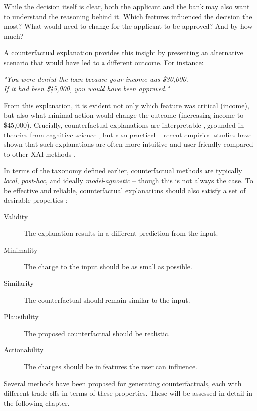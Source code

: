 While the decision itself is clear, both the applicant and the bank may also want to understand the reasoning behind it. Which features influenced the decision the most? What would need to change for the applicant to be approved? And by how much?

A counterfactual explanation provides this insight by presenting an alternative scenario that would have led to a different outcome. For instance:

\begin{center}
    \textit{"You were denied the loan because your income was \$30,000.\\
        If it had been \$45,000, you would have been approved."}
\end{center}

From this explanation, it is evident not only which feature was critical (income), but also what minimal action would change the outcome (increasing income to \$45,000).
Crucially, counterfactual explanations are interpretable \cite{pearl2009causal},
grounded in theories from cognitive science \cite{byrne2019counterfactuals},
but also practical -- recent empirical studies have shown that such explanations are often
more intuitive and user-friendly compared to other XAI methods \cite{warren2022features}.

In terms of the taxonomy defined earlier, counterfactual methods are typically \emph{local}, \emph{post-hoc}, and ideally \emph{model-agnostic} -- though this is not always the case.
To be effective and reliable, counterfactual explanations should also satisfy a set of desirable properties \cite{guidotti2018survey}:

\begin{description}
    \item[Validity] The explanation results in a different prediction from the input.
    \item[Minimality] The change to the input should be as small as possible.
    \item[Similarity] The counterfactual should remain similar to the input.
    \item[Plausibility] The proposed counterfactual should be realistic.
    \item[Actionability] The changes should be in features the user can influence.
\end{description}

Several methods have been proposed for generating counterfactuals,
each with different trade-offs in terms of these properties.
These will be assessed in detail in the following chapter.


